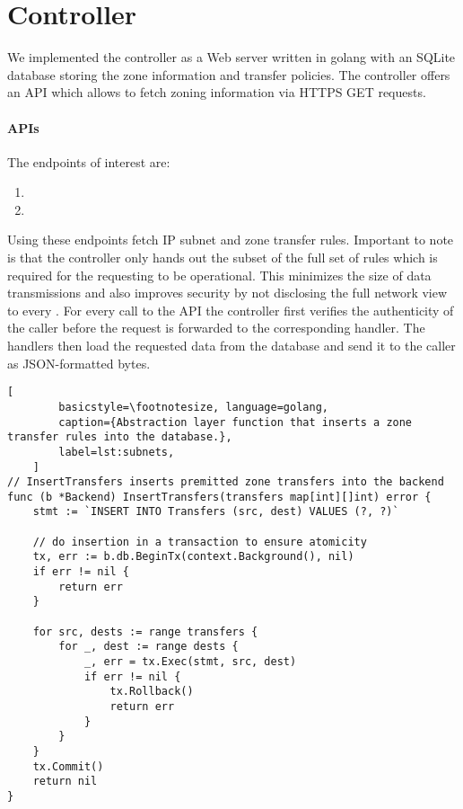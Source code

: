 \section{Controller}
\label{sec:controller}
	
We implemented the controller as a Web server written in golang with an SQLite database storing the
zone information and transfer policies. The controller offers an API which allows
\tps to fetch zoning information via HTTPS GET requests.
	
\paragraph{APIs}
The endpoints of interest are:
	
\begin{enumerate}
	\item {}
	\item {}
\end{enumerate}
	
Using these endpoints \tps fetch IP subnet and zone transfer rules. Important
to note is that the controller only hands out the subset of the full set of rules
which is required for the requesting \tp to be operational. This minimizes the size
of data transmissions and also improves security by not disclosing the full network
view to every \tp. For every call to the API the controller first verifies the
authenticity of the caller before the request is forwarded to the corresponding
handler. The handlers then load the requested data from the database and send it to
the caller as JSON-formatted bytes.
	
\begin{minipage}{\linewidth}
	\begin{lstlisting}[
		basicstyle=\footnotesize, language=golang,
		caption={Abstraction layer function that inserts a zone transfer rules into the database.},
		label=lst:subnets,
	]
// InsertTransfers inserts premitted zone transfers into the backend
func (b *Backend) InsertTransfers(transfers map[int][]int) error {
	stmt := `INSERT INTO Transfers (src, dest) VALUES (?, ?)`

	// do insertion in a transaction to ensure atomicity
	tx, err := b.db.BeginTx(context.Background(), nil)
	if err != nil {
		return err
	}

	for src, dests := range transfers {
		for _, dest := range dests {
			_, err = tx.Exec(stmt, src, dest)
			if err != nil {
				tx.Rollback()
				return err
			}
		}
	}
	tx.Commit()
	return nil
}
	\end{lstlisting}
\end{minipage}
	
